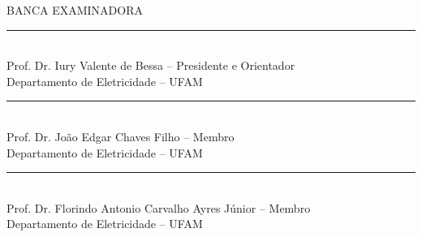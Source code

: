 \thispagestyle{empty}

\begin{center}

\autor


\vfill	\titulo


\vfill{
\begin{flushright}
	\begin{minipage}{8cm} 
		\apresentacao
	\end{minipage}
\end{flushright}
}

\vfill	{}


\vfill	BANCA EXAMINADORA

\vfill{
	\rule{300pt}{0.5pt} \\
	Prof. Dr. Iury Valente de Bessa -- Presidente e Orientador\\
	Departamento de Eletricidade -- UFAM
}

\vfill{
	\rule{300pt}{0.5pt} \\
	Prof. Dr. João Edgar Chaves Filho -- Membro \\
	Departamento de Eletricidade -- UFAM
}

\vfill{
	\rule{300pt}{0.5pt} \\
	Prof. Dr. Florindo Antonio Carvalho Ayres Júnior -- Membro\\
	Departamento de Eletricidade -- UFAM
}


\vfill \local

\end{center}
